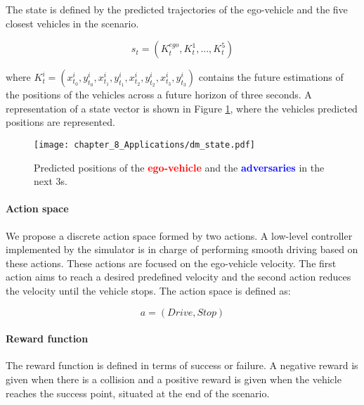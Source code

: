 The state is defined by the predicted trajectories of the ego-vehicle and the five closest vehicles in the scenario.

\begin{equation}
	s_t = (K^{ego}_t, K^1_t, ..., K^{5}_t)
	\label{eq:state}
\end{equation}

where $K^{i}_t = (x^i_{t_0}, y^i_{t_0}, x^i_{t_1}, y^i_{t_1}, x^i_{t_2}, y^i_{t_2}, x^i_{t_3}, y^i_{t_3})$ contains the future estimations of the positions of the vehicles across a future horizon of three seconds. A representation of a state vector is shown in Figure \ref{fig:chapter_8_Applications/dm_state}, where the vehicles predicted positions are represented.

\begin{figure}[h]
	\centering
	\texttt{[image: chapter\_8\_Applications/dm\_state.pdf]}
	\caption[Predicted positions of the ego-vehicle and the adversaries in the next 3s]{Predicted positions of the \textbf{\textcolor{red}{ego-vehicle}} and the \textbf{\textcolor{blue}{adversaries}} in the next 3s.}	
	\label{fig:chapter_8_Applications/dm_state}
\end{figure}

\paragraph{Action space}
\label{par:8_decision_making_our_approach_dm_action_space}

We propose a discrete action space formed by two actions. A low-level controller implemented by the simulator is in charge of performing smooth driving based on these actions. These actions are focused on the ego-vehicle velocity. The first action aims to reach a desired predefined velocity and the second action reduces the velocity until the vehicle stops. The action space is defined as:

\begin{equation}
	a=(Drive, Stop)    
	\label{eq:action}
\end{equation}

\paragraph{Reward function}
\label{par:8_decision_making_our_approach_dm_reward_function}

The reward function is defined in terms of success or failure. A negative reward is given when there is a collision and a positive reward is given when the vehicle reaches the success point, situated at the end of the scenario.

